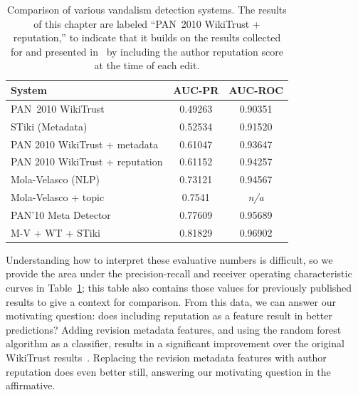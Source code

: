 \begin{table}[tbhp]
  \begin{center}
    \begin{tabular}{|l|c|c|}
      \hline
      \textbf{System} & \textbf{AUC-PR} & \textbf{AUC-ROC} \\
      \hline
      \hline
      PAN~2010 WikiTrust~\cite{Potthast2010b} & 0.49263 & 0.90351 \\
      STiki (Metadata)~\cite{Adler2011a} & 0.52534 & 0.91520 \\
      PAN 2010 WikiTrust + metadata~\cite{Adler2011a} & 0.61047 & 0.93647 \\
      PAN 2010 WikiTrust + reputation & 0.61152 & 0.94257 \\
      Mola-Velasco (NLP)~\cite{Adler2011a} & 0.73121 & 0.94567 \\
      Mola-Velasco + topic~\cite{Mola2011} & 0.7541 & \textit{n/a} \\
      PAN'10 Meta Detector~\cite{Potthast2010b} & 0.77609 & 0.95689 \\
      M-V + WT + STiki~\cite{Adler2011a} & 0.81829 & 0.96902 \\
      \hline
    \end{tabular}
  \end{center}
  \caption[Comparison of vandalism detection systems]{%
    Comparison of various vandalism detection systems.
    The results of this chapter are labeled ``PAN~2010 WikiTrust +
    reputation,'' to indicate that it builds on the results collected
    for and presented in~\cite{Potthast2010b} by including the
    author reputation score at the time of each edit.}
  \label{tab:vandalrep-context}
\end{table}

Understanding how to interpret these evaluative numbers is difficult,
so we provide the area under the precision-recall and receiver operating
characteristic curves in Table~\ref{tab:vandalrep-context}; this table
also contains those values for previously published results to give a
context for comparison.
From this data, we can answer our motivating question: does including
reputation as a feature result in better predictions?
Adding revision metadata features, and using the random forest
algorithm as a classifier, results in a significant improvement over the
original WikiTrust results~\cite{Adler2010b}.
Replacing the revision metadata features with author reputation does even better still,
answering our motivating question in the affirmative.



